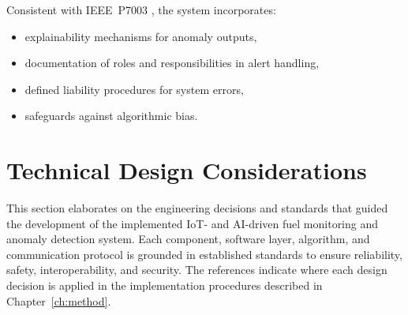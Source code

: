 Consistent with IEEE~P7003 \cite{ieeep7003}, the system incorporates:

\begin{itemize}
    \item explainability mechanisms for anomaly outputs,
    \item documentation of roles and responsibilities in alert handling,
    \item defined liability procedures for system errors,
    \item safeguards against algorithmic bias.
\end{itemize}

\section{Technical Design Considerations}  
\label{sec:techdesign}  

This section elaborates on the engineering decisions and standards that guided the development of the implemented IoT- and AI-driven fuel monitoring and anomaly detection system. Each component, software layer, algorithm, and communication protocol is grounded in established standards to ensure reliability, safety, interoperability, and security. The references indicate where each design decision is applied in the implementation procedures described in Chapter~\ref{ch:method}.  

